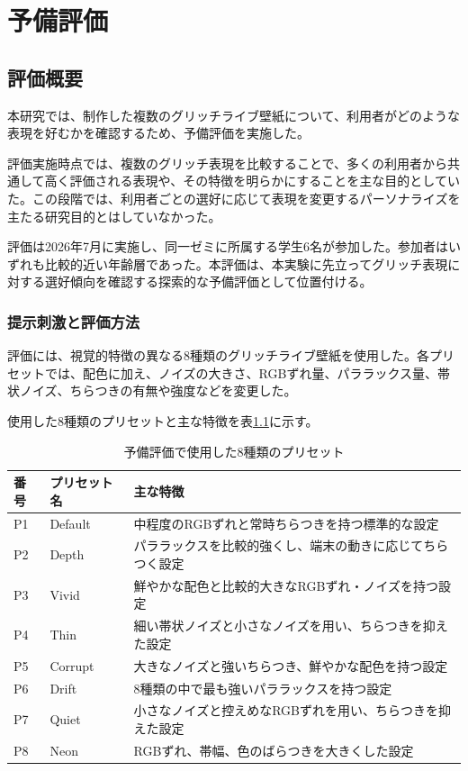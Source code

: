 \chapter{予備評価}

\section{評価概要}

本研究では、制作した複数のグリッチライブ壁紙について、利用者がどのような表現を好むかを確認するため、予備評価を実施した。

評価実施時点では、複数のグリッチ表現を比較することで、多くの利用者から共通して高く評価される表現や、その特徴を明らかにすることを主な目的としていた。この段階では、利用者ごとの選好に応じて表現を変更するパーソナライズを主たる研究目的とはしていなかった。

評価は2026年7月に実施し、同一ゼミに所属する学生6名が参加した。参加者はいずれも比較的近い年齢層であった。本評価は、本実験に先立ってグリッチ表現に対する選好傾向を確認する探索的な予備評価として位置付ける。


\subsection{提示刺激と評価方法}

評価には、視覚的特徴の異なる8種類のグリッチライブ壁紙を使用した。各プリセットでは、配色に加え、ノイズの大きさ、RGBずれ量、パララックス量、帯状ノイズ、ちらつきの有無や強度などを変更した。

使用した8種類のプリセットと主な特徴を表\ref{tab:preliminary_presets}に示す。

\begin{table}[htbp]
\centering
\caption{予備評価で使用した8種類のプリセット}
\label{tab:preliminary_presets}
\begin{tabular}{lll}
\hline
番号 & プリセット名 & 主な特徴 \\
\hline
P1 & Default & 中程度のRGBずれと常時ちらつきを持つ標準的な設定 \\
P2 & Depth & パララックスを比較的強くし、端末の動きに応じてちらつく設定 \\
P3 & Vivid & 鮮やかな配色と比較的大きなRGBずれ・ノイズを持つ設定 \\
P4 & Thin & 細い帯状ノイズと小さなノイズを用い、ちらつきを抑えた設定 \\
P5 & Corrupt & 大きなノイズと強いちらつき、鮮やかな配色を持つ設定 \\
P6 & Drift & 8種類の中で最も強いパララックスを持つ設定 \\
P7 & Quiet & 小さなノイズと控えめなRGBずれを用い、ちらつきを抑えた設定 \\
P8 & Neon & RGBずれ、帯幅、色のばらつきを大きくした設定 \\
\hline
\end{tabular}
\end{table}

